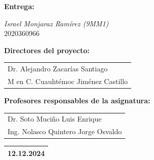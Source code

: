 \documentclass[11pt,a4paper]{article}
\begin{document}
	
	\begin{center}
		\begin{Large}
			\textbf{Entrega:}\\[0.2cm] 
		\end{Large}
		
			{\Large\textit{Israel Monjaraz Ramírez (9MM1)}}\\[0.2cm] 
			2020360966
		
		\begin{Large}
			\textbf{Directores del proyecto:}\\[0.2cm] 
		\end{Large}
		
		
		\begin{tabular}{l}
			Dr.	Alejandro Zacarías Santiago\\
			M en C. Cuauhtémoc Jiménez Castillo\\
		\end{tabular}

		
	\end{center}
	\vspace{0.2cm}
	\begin{center}
		\begin{Large}
			\textbf{Profesores responsables de la asignatura:}\\[0.2cm] 
		\end{Large}
		
		
		\begin{tabular}{l}
			Dr. Soto Muciño Luis Enrique\\
		Ing. Nolasco Quintero Jorge Osvaldo\\
		
		\end{tabular}
		
	\end{center}
	\vspace{0.8cm}
	\begin{flushright}
		\begin{tabular}{|c|}
			\hline
		12.12.2024\\
			\hline
		\end{tabular}
	\end{flushright}
\end{document}
